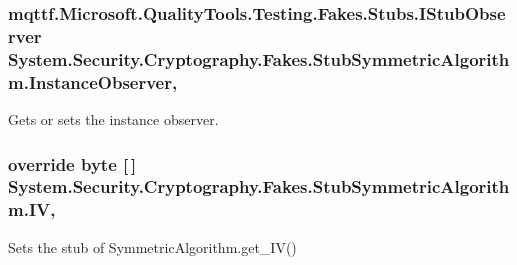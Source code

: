 \hypertarget{class_system_1_1_security_1_1_cryptography_1_1_fakes_1_1_stub_symmetric_algorithm_ada82b34cf4083c916b8c7732af3c06ba}{
\subsubsection[{Instance\-Observer}]{\setlength{\rightskip}{0pt plus 5cm}mqttf.\-Microsoft.\-Quality\-Tools.\-Testing.\-Fakes.\-Stubs.\-I\-Stub\-Observer System.\-Security.\-Cryptography.\-Fakes.\-Stub\-Symmetric\-Algorithm.\-Instance\-Observer\hspace{0.3cm}{\ttfamily [get]}, {\ttfamily [set]}}}\label{class_system_1_1_security_1_1_cryptography_1_1_fakes_1_1_stub_symmetric_algorithm_ada82b34cf4083c916b8c7732af3c06ba}


Gets or sets the instance observer.

\hypertarget{class_system_1_1_security_1_1_cryptography_1_1_fakes_1_1_stub_symmetric_algorithm_a764a03900faf7cca8cbcdbf3e2d0adb9}{
\subsubsection[{I\-V}]{\setlength{\rightskip}{0pt plus 5cm}override byte \mbox{[}$\,$\mbox{]} System.\-Security.\-Cryptography.\-Fakes.\-Stub\-Symmetric\-Algorithm.\-I\-V\hspace{0.3cm}{\ttfamily [get]}, {\ttfamily [set]}}}\label{class_system_1_1_security_1_1_cryptography_1_1_fakes_1_1_stub_symmetric_algorithm_a764a03900faf7cca8cbcdbf3e2d0adb9}


Sets the stub of Symmetric\-Algorithm.\-get\-\_\-\-I\-V()

